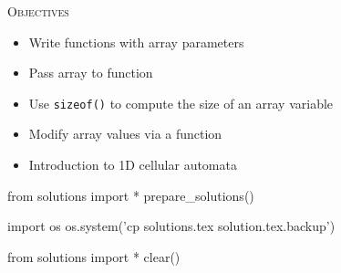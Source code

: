 
\textsc{Objectives}

\begin{itemize}

\item
  Write functions with array parameters
\item
  Pass array to function
\item
  Use \texttt{sizeof()} to compute the size of an array variable
\item
  Modify array values via a function
\item
  Introduction to 1D cellular automata
\end{itemize}









\begin{python0}
from solutions import *
prepare_solutions()
\end{python0}
\begin{python}
import os
os.system('cp solutions.tex solution.tex.backup')  
\end{python}

\begin{python0}
from solutions import *
clear()
\end{python0}
